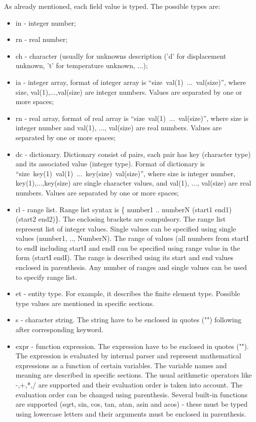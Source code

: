 \documentclass[a4paper]{article}
\begin{document}
As already mentioned, each field value is typed. The possible types are:
\begin{itemize}
\item in - integer number;
\item rn - real number;
\item ch - character (usually for unknowns description ('d' for
displacement unknown, 't' for temperature unknown, ...);
\item ia - integer array, format of integer array is
``size~val(1)~...~val(size)'', where size, val(1),...,val(size) are
integer numbers. Values are separated by one or more spaces;
\item rn - real array, format of real array is
``size~val(1)~...~val(size)'', where size is integer number and val(1),
..., val(size) are real numbers. Values are separated by one or more spaces;
\item dc - dictionary. Dictionary consist of pairs, each pair has key
(character type) and its associated value (integer type).
Format of dictionary is
``size~key(1)~val(1)~...~key(size)~val(size)'', where size is integer
number, key(1),...,key(size) are single character values, and val(1),
..., val(size) are real numbers. Values are separated by one or more spaces;
\item rl - range list. Range list syntax is \{ number1 .. numberN (start1
end1) (start2 end2)\}. The enclosing brackets are compulsory. The range
list represent list of integer values. Single values can be specified
using single values (number1, .., NumberN). The range of values
(all numbers from startI to endI including startI and endI can be
specified using range value in the form (startI endI). The range is
described using its start and end values enclosed in parenthesis.
Any number of ranges and single values can be used to specify range list.
\item et - entity type. For  example, it describes the finite element
type. Possible type values are mentioned in specific sections.
\item s - character string. The string have to be enclosed
in quotes ("") following after corresponding keyword.
\item expr - function expression. The expression have to be enclosed
in quotes (""). The expression is evaluated by internal parser and
represent mathematical expressions as a function of certain variables.
The variable names and meaning are described in specific sections.
The usual arithmetic operators like -,+,*,/ are supported and their
evaluation order is taken into account. The evaluation order can be
changed using parenthesis. Several built-in functions are supported
(sqrt, sin, cos, tan, atan, asin and acos) - these must be typed using
lowercase letters and their arguments must be enclosed in parenthesis.
\end{itemize}
\end{document}
